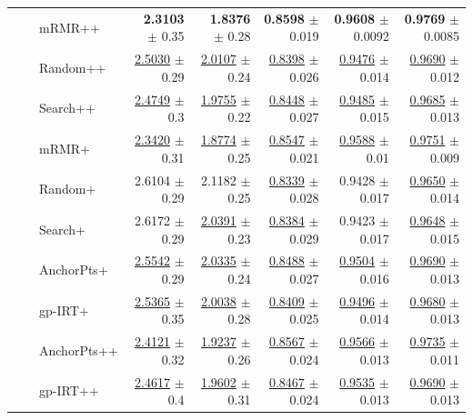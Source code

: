 \begin{longtable}{llp{}rrrrr}
 &  & mRMR++ & \textbf{2.3103} {\scriptsize $\pm$ 0.35} & \textbf{1.8376} {\scriptsize $\pm$ 0.28} & \textbf{0.8598} {\scriptsize $\pm$ 0.019} & \textbf{0.9608} {\scriptsize $\pm$ 0.0092} & \textbf{0.9769} {\scriptsize $\pm$ 0.0085} \\
 &  & Random++ & \underline{2.5030} {\scriptsize $\pm$ 0.29} & \underline{2.0107} {\scriptsize $\pm$ 0.24} & \underline{0.8398} {\scriptsize $\pm$ 0.026} & \underline{0.9476} {\scriptsize $\pm$ 0.014} & \underline{0.9690} {\scriptsize $\pm$ 0.012} \\
 &  & Search++ & \underline{2.4749} {\scriptsize $\pm$ 0.3} & \underline{1.9755} {\scriptsize $\pm$ 0.22} & \underline{0.8448} {\scriptsize $\pm$ 0.027} & \underline{0.9485} {\scriptsize $\pm$ 0.015} & \underline{0.9685} {\scriptsize $\pm$ 0.013} \\
 &  & mRMR+ & \underline{2.3420} {\scriptsize $\pm$ 0.31} & \underline{1.8774} {\scriptsize $\pm$ 0.25} & \underline{0.8547} {\scriptsize $\pm$ 0.021} & \underline{0.9588} {\scriptsize $\pm$ 0.01} & \underline{0.9751} {\scriptsize $\pm$ 0.009} \\
 &  & Random+ & 2.6104 {\scriptsize $\pm$ 0.29} & 2.1182 {\scriptsize $\pm$ 0.25} & \underline{0.8339} {\scriptsize $\pm$ 0.028} & 0.9428 {\scriptsize $\pm$ 0.017} & \underline{0.9650} {\scriptsize $\pm$ 0.014} \\
 &  & Search+ & 2.6172 {\scriptsize $\pm$ 0.29} & \underline{2.0391} {\scriptsize $\pm$ 0.23} & \underline{0.8384} {\scriptsize $\pm$ 0.029} & 0.9423 {\scriptsize $\pm$ 0.017} & \underline{0.9648} {\scriptsize $\pm$ 0.015} \\
 &  & AnchorPts+ & \underline{2.5542} {\scriptsize $\pm$ 0.29} & \underline{2.0335} {\scriptsize $\pm$ 0.24} & \underline{0.8488} {\scriptsize $\pm$ 0.027} & \underline{0.9504} {\scriptsize $\pm$ 0.016} & \underline{0.9690} {\scriptsize $\pm$ 0.013} \\
 &  & gp-IRT+ & \underline{2.5365} {\scriptsize $\pm$ 0.35} & \underline{2.0038} {\scriptsize $\pm$ 0.28} & \underline{0.8409} {\scriptsize $\pm$ 0.025} & \underline{0.9496} {\scriptsize $\pm$ 0.014} & \underline{0.9680} {\scriptsize $\pm$ 0.013} \\
 &  & AnchorPts++ & \underline{2.4121} {\scriptsize $\pm$ 0.32} & \underline{1.9237} {\scriptsize $\pm$ 0.26} & \underline{0.8567} {\scriptsize $\pm$ 0.024} & \underline{0.9566} {\scriptsize $\pm$ 0.013} & \underline{0.9735} {\scriptsize $\pm$ 0.011} \\
 &  & gp-IRT++ & \underline{2.4617} {\scriptsize $\pm$ 0.4} & \underline{1.9602} {\scriptsize $\pm$ 0.31} & \underline{0.8467} {\scriptsize $\pm$ 0.024} & \underline{0.9535} {\scriptsize $\pm$ 0.013} & \underline{0.9690} {\scriptsize $\pm$ 0.013} \\

\end{longtable}
